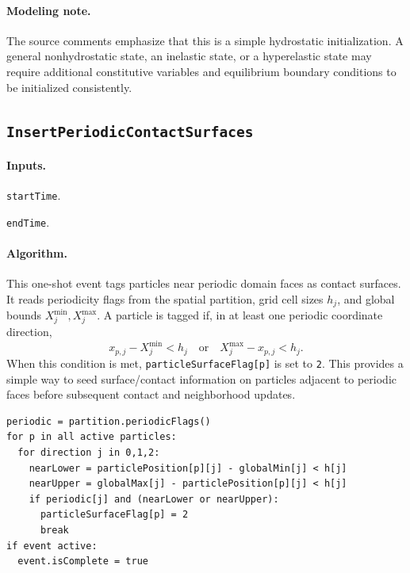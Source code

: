 \paragraph{Modeling note.}
The source comments emphasize that this is a simple hydrostatic initialization.  A general nonhydrostatic state, an inelastic state, or a hyperelastic state may require additional constitutive variables and equilibrium boundary conditions to be initialized consistently.

\subsection{\texttt{InsertPeriodicContactSurfaces}}
\label{subsec:event-insert-periodic-contact-surfaces}

\paragraph{Inputs.}
\begin{description}[leftmargin=*,style=nextline]
\item[\textbf{Required.}] \texttt{startTime}.
\item[\textbf{Optional.}] \texttt{endTime}.
\end{description}

\paragraph{Algorithm.}
This one-shot event tags particles near periodic domain faces as contact surfaces.  It reads periodicity flags from the spatial partition, grid cell sizes $h_j$, and global bounds $X_j^{\min},X_j^{\max}$.  A particle is tagged if, in at least one periodic coordinate direction,
\begin{equation}
  x_{p,j}-X_j^{\min}<h_j
  \quad\text{or}\quad
  X_j^{\max}-x_{p,j}<h_j.
\end{equation}
When this condition is met, \texttt{particleSurfaceFlag[p]} is set to \texttt{2}.  This provides a simple way to seed surface/contact information on particles adjacent to periodic faces before subsequent contact and neighborhood updates.

\begin{lstlisting}[caption={InsertPeriodicContactSurfaces event pseudocode.}]
periodic = partition.periodicFlags()
for p in all active particles:
  for direction j in 0,1,2:
    nearLower = particlePosition[p][j] - globalMin[j] < h[j]
    nearUpper = globalMax[j] - particlePosition[p][j] < h[j]
    if periodic[j] and (nearLower or nearUpper):
      particleSurfaceFlag[p] = 2
      break
if event active:
  event.isComplete = true
\end{lstlisting}

